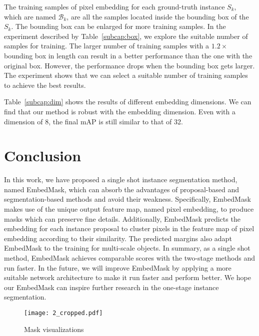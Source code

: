 \documentclass[10pt,twocolumn,letterpaper]{article}
\begin{document}
\medbreak
{}
The training samples of pixel embedding for each ground-truth instance $S_k$, which are named $\mathcal{B}_k$, are all the samples located inside the bounding box of the $S_k$. 
The bounding box can be enlarged for more training samples. 
In the experiment described by Table~\ref{subcap:box}, we explore the suitable number of samples for training. 
The larger number of training samples with a $1.2\times$ bounding box in length can result in a better performance than the one with the original box. 
However, the performance drops when the bounding box gets larger. 
The experiment shows that we can select a suitable number of training samples to achieve the best results.

\medbreak
{}
Table~\ref{subcap:dim} shows the results of different embedding dimensions. 
We can find that our method is robust with the embedding dimension. Even with a dimension of 8, the final mAP is still similar to that of 32. 


\section{Conclusion}

In this work, we have proposed a single shot instance segmentation method, named EmbedMask, which can absorb the advantages of proposal-based and segmentation-based methods and avoid their weakness.
Specifically, EmbedMask makes use of the unique output feature map, named pixel embedding, to produce masks which can preserve fine details. 
Additionally, EmbedMask predicts the embedding for each instance proposal to cluster pixels in the feature map of pixel embedding according to their similarity. 
The predicted margins also adapt EmbedMask to the training for multi-scale objects.
In summary, as a single shot method, EmbedMask achieves comparable scores with the two-stage methods and run faster. 
In the future, we will improve EmbedMask by applying a more suitable network architecture to make it run faster and perform better. 
We hope our EmbedMask can inspire further research in the one-stage instance segmentation.





{\small


}

\begin{figure*}
   \begin{center}
      \texttt{[image: 2\_cropped.pdf]}
   \end{center}\vspace{-0.1in}
      \caption{Mask visualizations}
   \label{fig:maskvis}
\end{figure*}
\end{document}
